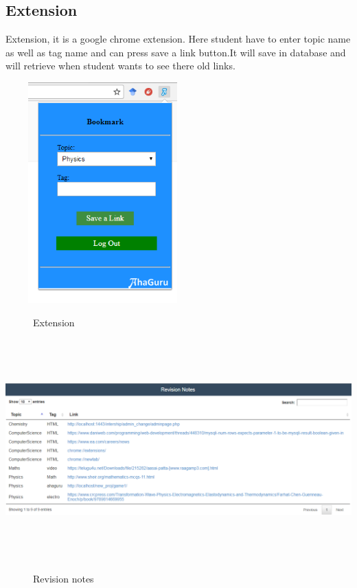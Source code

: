 \subsection{Extension}
Extension, it is a google chrome extension. Here student have to enter topic name as well as tag name and can press save a link button.It will save in database and will retrieve when student wants to see there old links.
\begin{center}
	\includegraphics[width=7.5cm, height=8.5cm]{extension.png}
	\begin{figure}[h!]
		\centering
		\caption{Extension}%
	\end{figure}
\end{center}\break
\begin{center}
	\includegraphics[width=13.6cm, height=8.5cm]{revision_notes.png}
	\begin{figure}[h!]
		\centering
		\caption{Revision notes}%
	\end{figure}
\end{center}\break
